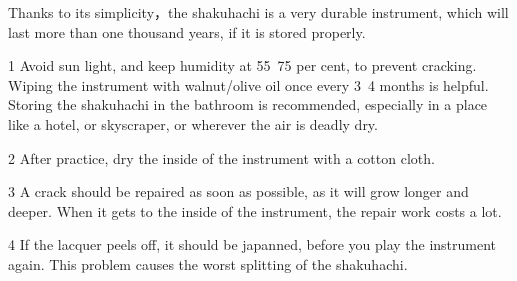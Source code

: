 ﻿Thanks to its simplicity，the shakuhachi is a very durable instrument, which will last more than one thousand years, if it is stored properly. 

\par

1  Avoid sun light, and keep humidity at 55~75 per cent, to prevent cracking.\\
   Wiping the instrument with walnut/olive oil once every 3~4 months is helpful.\\
   Storing the shakuhachi in the bathroom is recommended, especially in a place like a hotel, or skyscraper, or wherever the air is deadly dry. 

\par

2  After practice, dry the inside of the instrument with a cotton cloth.

\par

3  A crack should be repaired as soon as possible, as it will grow longer and deeper.
   When it gets to the inside of the instrument, the repair work costs a lot.

\par

4  If the lacquer peels off, it should be japanned, before you play the 
   instrument again. This problem causes the worst splitting of the shakuhachi.

